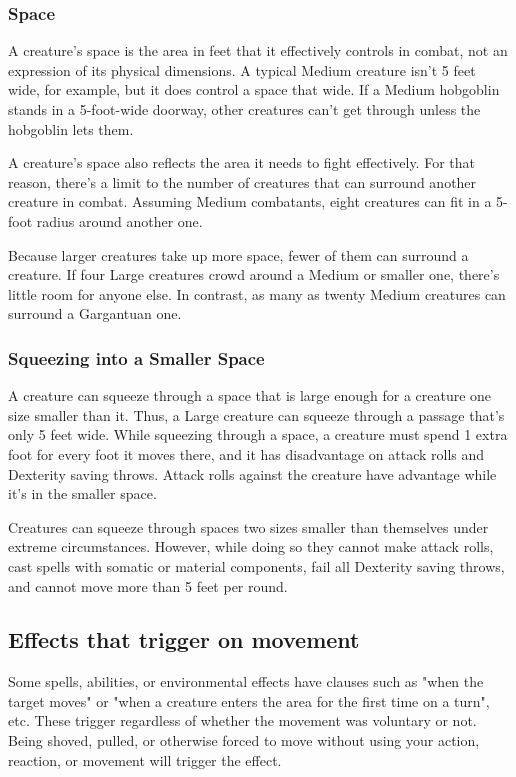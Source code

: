 \subsubsection{Space}

A creature's space is the area in feet that it effectively controls in combat, not an expression of its physical dimensions. A typical Medium creature isn't 5 feet wide, for example, but it does control a space that wide. If a Medium hobgoblin stands in a 5-foot-wide doorway, other creatures can't get through unless the hobgoblin lets them.

A creature's space also reflects the area it needs to fight effectively. For that reason, there's a limit to the number of creatures that can surround another creature in combat. Assuming Medium combatants, eight creatures can fit in a 5-foot radius around another one.

Because larger creatures take up more space, fewer of them can surround a creature. If four Large creatures crowd around a Medium or smaller one, there's little room for anyone else. In contrast, as many as twenty Medium creatures can surround a Gargantuan one.

\subsubsection{Squeezing into a Smaller Space}

A creature can squeeze through a space that is large enough for a creature one size smaller than it. Thus, a Large creature can squeeze through a passage that's only 5 feet wide. While squeezing through a space, a creature must spend 1 extra foot for every foot it moves there, and it has disadvantage on attack rolls and Dexterity saving throws. Attack rolls against the creature have advantage while it's in the smaller space.

Creatures can squeeze through spaces two sizes smaller than themselves under extreme circumstances. However, while doing so they cannot make attack rolls, cast spells with somatic or material components, fail all Dexterity saving throws, and cannot move more than 5 feet per round.

\subsection{Effects that trigger on movement}
Some spells, abilities, or environmental effects have clauses such as "when the target moves" or "when a creature enters the area for the first time on a turn", etc. These trigger regardless of whether the movement was voluntary or not. Being shoved, pulled, or otherwise forced to move without using your action, reaction, or movement will trigger the effect.

